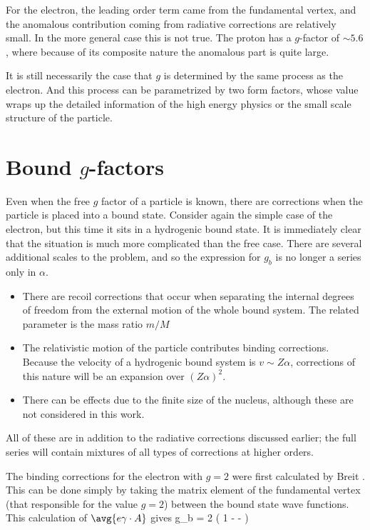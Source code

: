 For the electron, the leading order term came from the fundamental vertex, and the anomalous contribution coming from radiative corrections are relatively small.  In the more general case this is not true.  The proton has a $g$-factor of $\sim 5.6$, where because of its composite nature the anomalous part is quite large.

It is still necessarily the case that $g$ is determined by the same process as the electron.  And this process can be parametrized by two form factors, whose value wraps up the detailed information of the high energy physics or the small scale structure of the particle. 

\section{Bound $g$-factors}

Even when the free $g$ factor of a particle is known, there are corrections when the particle is placed into a bound state.  Consider again the simple case of the electron, but this time it sits in a hydrogenic bound state.  It is immediately clear that the situation is much more complicated than the free case.  There are several additional scales to the problem, and so the expression for $g_b$ is no longer a series only in $\alpha$.
\begin{itemize}
  \item 	There are recoil corrections that occur when separating the internal degrees of freedom from the external motion of the whole bound system.  The related parameter is the mass ratio $m/M$	%
  \item 	The relativistic motion of the particle contributes binding corrections.  Because the velocity of a hydrogenic bound system is $v \sim Z\alpha$, corrections of this nature will be an expansion over $(Z\alpha)^2$.
  \item		There can be effects due to the finite size of the nucleus, although these are not considered in this work.
\end{itemize}
All of these are in addition to the radiative corrections discussed earlier; the full series will contain mixtures of all types of corrections at higher orders.

The binding corrections for the electron with $g=2$ were first calculated by Breit \cite{Breit1928}.  This can be done simply by taking the matrix element of the fundamental vertex (that responsible for the value $g=2$)  between the bound state wave functions.  This calculation of $\avg{ e\gamma \cdot A}$ gives
\beq 
	g_b = 2 \left( 1 -  -  \right )
\eeq



